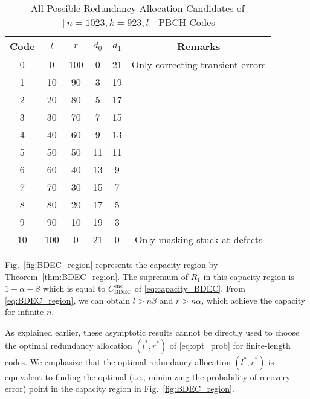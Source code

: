 \documentclass[10pt,twocolumn,twoside,submit]{JCNtran}
\begin{document}
	\begin{table}[t]
		\caption{All Possible Redundancy Allocation Candidates of $\left[ n = 1023, k=923, l \right]$ PBCH Codes}
		\label{tab:PLBC}
		\centering
		\renewcommand{\arraystretch}{1.1}
		\small{
		\begin{tabular}{c|c|c|c|c|c}
			\hline
			Code & {$l$} & {$r$} & {$d_0$} & {$d_1$} & Remarks   \\ \hline \hline
			0 & 0 & 100 & 0 & 21 & Only correcting transient errors\\ \hline
			1 & 10 & 90 & 3 & 19 &\\ \hline
			2 & 20 & 80 & 5 & 17 &\\ \hline
			3 & 30 & 70 & 7 & 15 &\\ \hline
			4 & 40 & 60 & 9 & 13 &\\ \hline
			5 & 50 & 50 & 11 & 11 & \\ \hline
			6 & 60 & 40 & 13 & 9 &\\ \hline
			7 & 70 & 30 & 15 & 7 &\\ \hline
			8 & 80 & 20 & 17 & 5 &\\ \hline
			9 & 90 & 10 & 19 & 3 &\\ \hline
			10& 100 & 0 & 21 & 0 & Only masking stuck-at defects\\ \hline
		\end{tabular}}
		\vspace{-5mm}
	\end{table}	
	
	Fig.~\ref{fig:BDEC_region} represents the capacity region by Theorem~\ref{thm:BDEC_region}. The supremum of $R_1$ in this capacity region is $1 - \alpha - \beta$ which is equal to $C_{\text{BDEC}}^{\text{enc}}$ of \eqref{eq:capacity_BDEC}. From \eqref{eq:BDEC_region}, we can obtain $l  > n\beta$ and $r > n \alpha$, which achieve the capacity for infinite $n$.

	As explained earlier, these asymptotic results cannot be directly used to choose the optimal redundancy allocation $\left(l^*, r^*\right)$ of \eqref{eq:opt_prob} for finite-length codes. We emphasize that the optimal redundancy allocation $\left(l^*, r^*\right)$ is equivalent to finding the optimal (i.e., minimizing the probability of recovery error) point in the capacity region in Fig.~\ref{fig:BDEC_region}.
	
\end{document}
